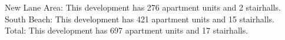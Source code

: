 {New Lane Area}: This development has 276 apartment units and 2 stairhalls.\\{South Beach}: This development has 421 apartment units and 15 stairhalls.\\{Total}: This development has 697 apartment units and 17 stairhalls.\\